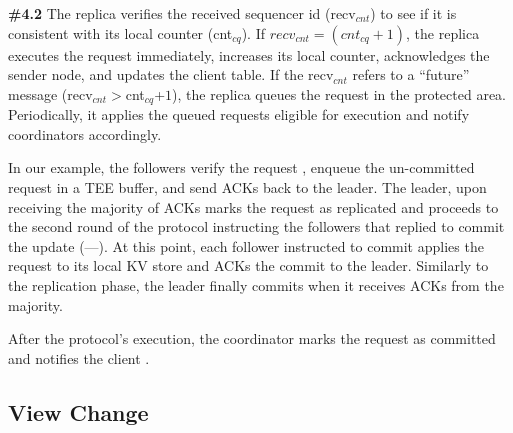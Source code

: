     {\bf{\#4.2}} The replica verifies the received sequencer id (recv$_{cnt}$) to see if it is consistent with its local counter (cnt$_{cq}$). If $recv_{cnt} = (cnt_{cq}+1)$, the replica executes the request immediately, increases its local counter, acknowledges the sender node, and updates the client table. If the recv$_{cnt}$ refers to a ``future'' message (recv$_{cnt}$$>$cnt$_{cq}$+$1$), the replica queues the request in the protected area. Periodically, it applies the queued requests eligible for execution and notify coordinators accordingly.

     In our example, the followers verify the request , enqueue the un-committed request in a TEE buffer, and send ACKs back to the leader. The leader, upon receiving the majority of ACKs marks the request as replicated  and proceeds to the second round of the protocol instructing the followers that replied to commit the update (---). At this point, each follower instructed to commit applies the request to its local KV store  and ACKs the commit to the leader. Similarly to the replication phase, the leader finally commits  when it receives ACKs from the majority.
    
     After the protocol's execution, the coordinator marks the request as committed and notifies the client .
    





\subsection{View Change}
\fi

